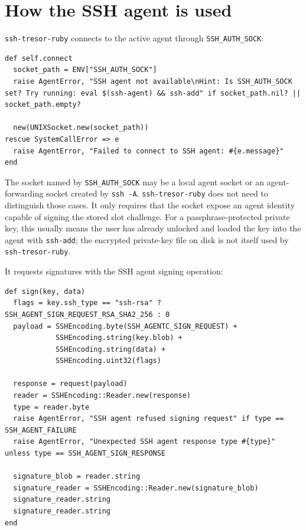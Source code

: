 \documentclass[11pt]{article}
\theoremstyle{definition}
\theoremstyle{plain}
\newcommand{\Project}{\texttt{ssh-tresor-ruby}}
\begin{document}
\section{How the SSH agent is used}

\Project{} connects to the active agent through \texttt{SSH\_AUTH\_SOCK}:

\begin{lstlisting}[style=rubycode,caption={Agent socket connection from lib/ssh\_tresor/agent.rb.}]
def self.connect
  socket_path = ENV["SSH_AUTH_SOCK"]
  raise AgentError, "SSH agent not available\nHint: Is SSH_AUTH_SOCK set? Try running: eval $(ssh-agent) && ssh-add" if socket_path.nil? || socket_path.empty?

  new(UNIXSocket.new(socket_path))
rescue SystemCallError => e
  raise AgentError, "Failed to connect to SSH agent: #{e.message}"
end
\end{lstlisting}

The socket named by \texttt{SSH\_AUTH\_SOCK} may be a local agent socket or an agent-forwarding socket created by \texttt{ssh -A}. \Project{} does not need to distinguish those cases. It only requires that the socket expose an agent identity capable of signing the stored slot challenge. For a passphrase-protected private key, this usually means the user has already unlocked and loaded the key into the agent with \texttt{ssh-add}; the encrypted private-key file on disk is not itself used by \Project{}.

It requests signatures with the SSH agent signing operation:

\begin{lstlisting}[style=rubycode,caption={Signing request from lib/ssh\_tresor/agent.rb.}]
def sign(key, data)
  flags = key.ssh_type == "ssh-rsa" ? SSH_AGENT_SIGN_REQUEST_RSA_SHA2_256 : 0
  payload = SSHEncoding.byte(SSH_AGENTC_SIGN_REQUEST) +
            SSHEncoding.string(key.blob) +
            SSHEncoding.string(data) +
            SSHEncoding.uint32(flags)

  response = request(payload)
  reader = SSHEncoding::Reader.new(response)
  type = reader.byte
  raise AgentError, "SSH agent refused signing request" if type == SSH_AGENT_FAILURE
  raise AgentError, "Unexpected SSH agent response type #{type}" unless type == SSH_AGENT_SIGN_RESPONSE

  signature_blob = reader.string
  signature_reader = SSHEncoding::Reader.new(signature_blob)
  signature_reader.string
  signature_reader.string
end
\end{lstlisting}
\end{document}

